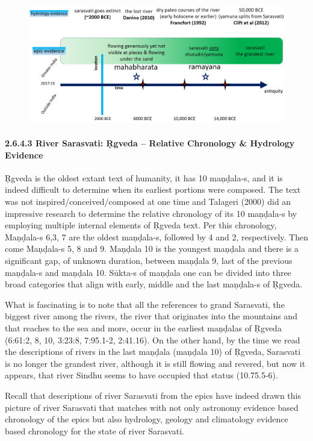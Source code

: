 \begin{figure}[!htbp]
\includegraphics[scale=0.2]{"images/8-22.jpg"}
\caption{}\label{art8-fig22}
\end{figure}


\paragraph*{2.6.4.3 River Sarasvati: Ṛgveda – Relative Chronology \& Hydrology Evidence}

Ṛgveda is the oldest extant text of humanity, it has 10 maņḍala-s, and it is indeed difficult to determine when its earliest portions were composed. The text was not inspired/conceived/composed at one time and Talageri (2000) did an impressive research to determine the relative chronology of its 10 maņḍala-s by employing multiple internal elements of Ṛgveda text. Per this chronology, Maņḍala-s 6,3, 7 are the oldest maņḍala-s, followed by 4 and 2, respectively. Then come Maņḍala-s 5, 8 and 9. Maņḍala 10 is the youngest maņḍala and there is a significant gap, of unknown duration, between maņḍala 9, last of the previous maņḍala-s and maņḍala 10. Sūkta-s of maņḍala one can be divided into three broad categories that align with early, middle and the last maņḍala-s of Ṛgveda.

What is fascinating is to note that all the references to grand Sarasvati, the biggest river among the rivers, the river that originates into the mountains and that reaches to the sea and more, occur in the earliest maņḍalas of Ṛgveda (6:61:2, 8, 10, 3:23:8, 7:95.1-2, 2:41.16). On the other hand, by the time we read the descriptions of rivers in the last maņḍala (maņḍala 10) of Ṛgveda, Sarasvati is no longer the grandest river, although it is still flowing and revered, but now it appears, that river Sindhu seems to have occupied that status (10.75.5-6).

Recall that descriptions of river Sarasvati from the epics have indeed drawn this picture of river Sarasvati that matches with not only astronomy evidence based chronology of the epics but also hydrology, geology and climatology evidence based chronology for the state of river Sarasvati.

